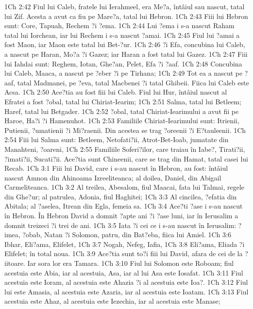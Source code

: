 1Ch 2:42  Fiul lui Caleb, fratele lui Ierahmeel, era Me?a, întâiul sau nascut, tatal lui Zif. Acesta a avut ca fiu pe Mare?a, tatal lui Hebron.
1Ch 2:43  Fiii lui Hebron sunt: Core, Tapuah, Rechem ?i ?ema.
1Ch 2:44  Lui ?ema i s-a nascut Raham tatal lui Iorchean, iar lui Rechem i s-a nascut ?amai.
1Ch 2:45  Fiul lui ?amai a fost Maon, iar Maon este tatal lui Bet-?ur.
1Ch 2:46  ?i Efa, concubina lui Caleb, a nascut pe Haran, Mo?a ?i Gazez; iar Haran a fost tatal lui Gazez.
1Ch 2:47  Fiii lui Iahdai sunt: Reghem, Iotan, Ghe?an, Pelet, Efa ?i ?aaf.
1Ch 2:48  Concubina lui Caleb, Maaca, a nascut pe ?eber ?i pe Tirhana;
1Ch 2:49  Tot ea a nascut pe ?aaf, tatal Madmanei, pe ?eva, tatal Macbenei ?i tatal Ghibeii. Fiica lui Caleb este Acsa.
1Ch 2:50  Ace?tia au fost fiii lui Caleb. Fiul lui Hur, întâiul nascut al Efratei a fost ?obal, tatal lui Chiriat-Iearim;
1Ch 2:51  Salma, tatal lui Betleem; Haref, tatal lui Betgader.
1Ch 2:52  ?obal, tatal Chiriat-Iearimului a avut fii pe Haroe, Ha?i ?i Hamenuhot.
1Ch 2:53  Familiile Chiriat-Iearimului sunt: Itrienii, Putienii, ?umatienii ?i Mi?raenii. Din acestea se trag ?oreenii ?i E?tauleenii.
1Ch 2:54  Fiii lui Salma sunt: Betleem, Netofati?ii, Atrot-Bet-Ioab, jumatate din Manahteni, ?oareni,
1Ch 2:55  Familiile Soferi?ilor, care traiau în Iabe?, Tirati?ii, ?imati?ii, Sucati?ii. Ace?tia sunt Chineenii, care se trag din Hamat, tatal casei lui Recab.
1Ch 3:1  Fiii lui David, care i s-au nascut în Hebron, au fost: întâiul nascut Amnon din Ahinoama Izreeliteanca; al doilea, Daniel, din Abigail Carmeliteanca.
1Ch 3:2  Al treilea, Abesalom, fiul Maacai, fata lui Talmai, regele din Ghe?ur; al patrulea, Adonia, fiul Haghitei;
1Ch 3:3  Al cincilea, ?efatia din Abitala; al ?aselea, Itrean din Egla, femeia sa.
1Ch 3:4  Ace?ti ?ase i s-au nascut în Hebron. În Hebron David a domnit ?apte ani ?i ?ase luni, iar în Ierusalim a domnit treizeci ?i trei de ani.
1Ch 3:5  Iata ?i cei ce i s-au nascut în Ierusalim: ?imea, ?obab, Natan ?i Solomon, patru, din Bat?eba, fiica lui Amiel.
1Ch 3:6  Ibhar, Eli?ama, Elifelet,
1Ch 3:7  Nogah, Nefeg, Iafia,
1Ch 3:8  Eli?ama, Eliada ?i Elifelet; în total noua.
1Ch 3:9  Ace?tia sunt to?i fiii lui David, afara de cei de la ?iitoare. Iar sora lor era Tamara.
1Ch 3:10  Fiul lui Solomon este Roboam; fiul acestuia este Abia, iar al acestuia, Asa, iar al lui Asa este Iosafat.
1Ch 3:11  Fiul acestuia este Ioram, al acestuia este Ahazia ?i al acestuia este Ioa?.
1Ch 3:12  Fiul lui este Amasia, al acestuia este Azaria, iar al acestuia este Ioatam.
1Ch 3:13  Fiul acestuia este Ahaz, al acestuia este Iezechia, iar al acestuia este Manase;
